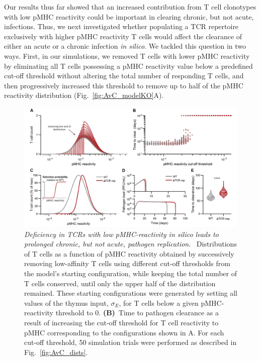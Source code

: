 Our results thus far showed that an increased contribution from T cell clonotypes with low pMHC reactivity could be important in clearing chronic, but not acute, infections. Thus, we next investigated whether populating a TCR repertoire exclusively with higher pMHC reactivity T cells would affect the clearance of either an acute or a chronic infection \textit{in silico}. We tackled this question in two ways. First, in our simulations, we removed T cells with lower pMHC reactivity by eliminating all T cells possessing a pMHC reactivity value below a predefined cut-off threshold without altering the total number of responding T cells, and then progressively increased this threshold to remove up to half of the pMHC reactivity distribution (Fig.~\ref{fig:AvC_modelKO}A). %
%
\begin{figure}[tb]
    \centering
    \includegraphics[width=\textwidth]{Figures/AvC/fig4_modelKO.pdf}
    \caption[Deficiency in TCRs with low pMHC-reactivity in silico leads to prolonged chronic, but not acute, pathogen replication]{%
    \textit{Deficiency in TCRs with low pMHC-reactivity in silico leads to prolonged chronic, but not acute, pathogen replication}. %
    ~Distributions of T cells as a function of pMHC reactivity obtained by successively removing low-affinity T cells using different cut-off thresholds from the model’s starting configuration, while keeping the total number of T cells conserved, until only the upper half of the distribution remained. These starting configurations were generated by setting all values of the thymus input, $\sigma_E$, for T cells below a given pMHC-reactivity threshold to 0. \textbf{(B)}~Time to pathogen clearance as a result of increasing the cut-off threshold for T cell reactivity to pMHC corresponding to the configurations shown in A. For each cut-off threshold, 50 simulation trials were performed as described in Fig.~\ref{fig:AvC_dists}. %
}
\end{figure}
